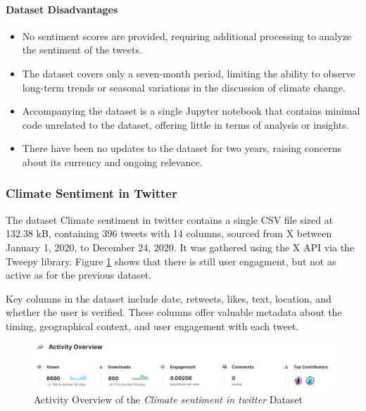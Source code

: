 \paragraph{Dataset Disadvantages}
\begin{itemize}
    \item No sentiment scores are provided, requiring additional processing to analyze the sentiment of the tweets.
    \item The dataset covers only a seven-month period, limiting the ability to observe long-term trends or seasonal variations in the discussion of climate change.
    \item Accompanying the dataset is a single Jupyter notebook that contains minimal code unrelated to the dataset, offering little in terms of analysis or insights.
    \item There have been no updates to the dataset for two years, raising concerns about its currency and ongoing relevance.
\end{itemize}

\subsubsection{Climate Sentiment in Twitter}
The dataset Climate sentiment in twitter \cite{ClimateSentimentInTwitter} contains a single CSV file sized at 132.38 kB, containing 396 tweets with 14 columns, sourced from X between January 1, 2020, to December 24, 2020. It was gathered using the X API via the Tweepy library. Figure \ref{fig:ds_2_activity} shows that there is still user engagment, but not as active as for the previous dataset.

Key columns in the dataset include date, retweets, likes, text, location, and whether the user is verified. These columns offer valuable metadata about the timing, geographical context, and user engagement with each tweet.

\begin{figure}[h]
    \includegraphics[width=\textwidth]{images/dataset/ds_2_activity.JPG}
    \caption{Activity Overview of the \emph{Climate sentiment in twitter} Dataset\protect\footnotemark}
    \label{fig:ds_2_activity}
\end{figure}

